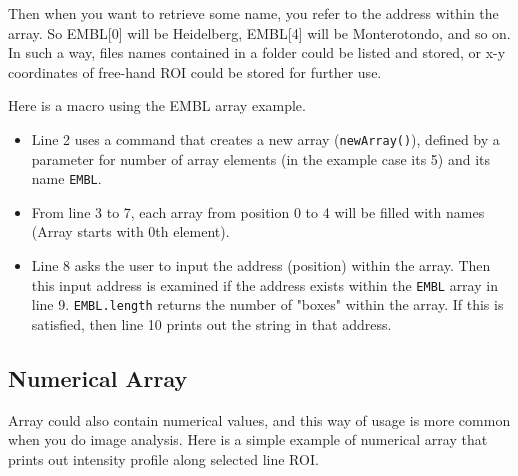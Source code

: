 \documentclass[11pt,a4paper,oneside]{report}
\newcommand{\ilcom}[1]{\texttt{\small#1}}
\begin{document}
Then when you want to retrieve some name, you refer to the address within the array. 
So EMBL[0] will be Heidelberg, EMBL[4] will be Monterotondo, and so on. 
In such a way, files names contained in a folder could be listed and stored, 
or x-y coordinates of free-hand ROI could be stored for further use. 

Here is a macro using the EMBL array example. 



\begin{itemize}
\item Line 2 uses a command that creates a new array (\ilcom{newArray()}), defined by a parameter for number of array elements (in the example case its 5) and its name \ilcom{EMBL}. 
\item From line 3 to 7, each array from position 0 to 4 will be filled with names (Array starts with 0th element). 
\item Line 8 asks the user to input the address (position) within the array. Then this input address is examined if the address exists within the \ilcom{EMBL} array in line 9. \ilcom{EMBL.length} returns the number of "boxes" within the array. If this is satisfied, then line 10 prints out the string in that address.
\end{itemize}

\subsection{Numerical Array}

Array could also contain numerical values, and this way of usage is more common when you do image analysis. Here is a simple example of numerical array that prints out intensity profile along selected line ROI. 


\end{document}
